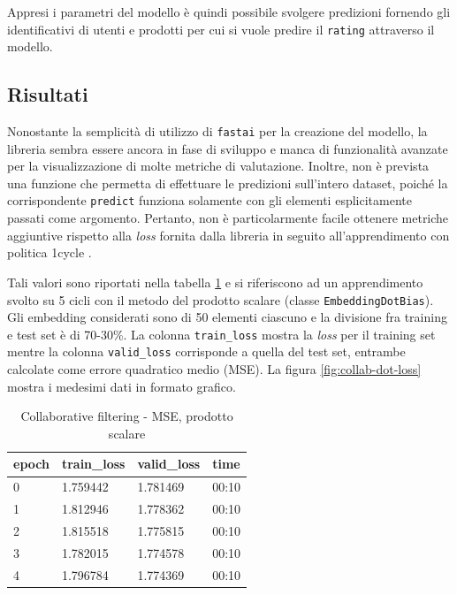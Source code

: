 \documentclass[hidelinks, 12pt]{article}
\begin{document}
Appresi i parametri del modello è quindi possibile svolgere predizioni fornendo gli identificativi di utenti e prodotti per cui si vuole predire il \texttt{rating} attraverso il modello.



\subsection{Risultati}

Nonostante la semplicità di utilizzo di \texttt{fastai} per la creazione del modello, la libreria sembra essere ancora in fase di sviluppo e manca di funzionalità avanzate per la visualizzazione di molte metriche di valutazione. Inoltre, non è prevista una funzione che permetta di effettuare le predizioni sull'intero dataset, poiché la corrispondente \texttt{predict} funziona solamente con gli elementi esplicitamente passati come argomento. Pertanto, non è particolarmente facile ottenere metriche aggiuntive rispetto alla \textit{loss} fornita dalla libreria in seguito all'apprendimento con politica 1cycle \cite{site:1cycle}.

Tali valori sono riportati nella tabella \ref{tab:collab-dot-loss} e si riferiscono ad un apprendimento svolto su 5 cicli con il metodo del prodotto scalare (classe \texttt{EmbeddingDotBias}). Gli embedding considerati sono di 50 elementi ciascuno e la divisione fra training e test set è di 70-30\%. La colonna \texttt{train\_loss} mostra la \textit{loss} per il training set mentre la colonna \texttt{valid\_loss} corrisponde a quella del test set, entrambe calcolate come errore quadratico medio (MSE). La figura \ref{fig:collab-dot-loss} mostra i medesimi dati in formato grafico.

\begin{table}[H]
	\caption{Collaborative filtering - MSE, prodotto scalare}\label{tab:collab-dot-loss}
	\centering
	\begin{tabular}{|l|l|l|l|}
		\hline
		epoch & train\_loss & valid\_loss & time \\
		\hline
		0 & 1.759442 & 1.781469 & 00:10 \\
		1 & 1.812946 & 1.778362 & 00:10 \\
		2 & 1.815518 & 1.775815 & 00:10 \\
		3 & 1.782015 & 1.774578 & 00:10 \\
		4 & 1.796784 & 1.774369 & 00:10 \\
		\hline
	\end{tabular}
\end{table}
\end{document}
